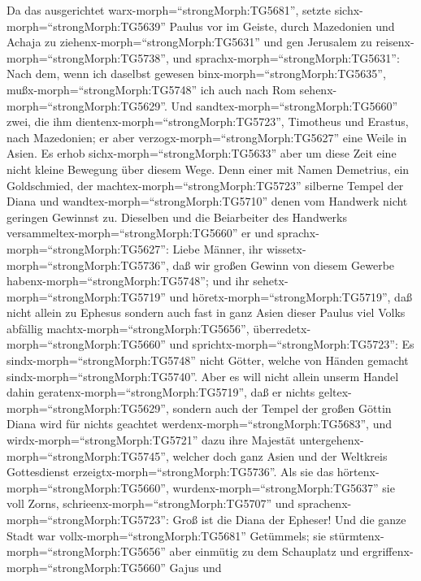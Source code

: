 Da das ausgerichtet warx-morph=``strongMorph:TG5681'', setzte
sichx-morph=``strongMorph:TG5639'' Paulus vor im Geiste, durch
Mazedonien und Achaja zu ziehenx-morph=``strongMorph:TG5631'' und gen
Jerusalem zu reisenx-morph=``strongMorph:TG5738'', und
sprachx-morph=``strongMorph:TG5631'': Nach dem, wenn ich daselbst
gewesen binx-morph=``strongMorph:TG5635'',
mußx-morph=``strongMorph:TG5748'' ich auch nach Rom
sehenx-morph=``strongMorph:TG5629''.  Und
sandtex-morph=``strongMorph:TG5660'' zwei, die ihm
dientenx-morph=``strongMorph:TG5723'', Timotheus und Erastus, nach
Mazedonien; er aber verzogx-morph=``strongMorph:TG5627'' eine Weile in
Asien.  Es erhob sichx-morph=``strongMorph:TG5633'' aber um
diese Zeit eine nicht kleine Bewegung über diesem Wege. 
Denn einer mit Namen Demetrius, ein Goldschmied, der
machtex-morph=``strongMorph:TG5723'' silberne Tempel der Diana und
wandtex-morph=``strongMorph:TG5710'' denen vom Handwerk nicht geringen
Gewinnst zu.  Dieselben und die Beiarbeiter des Handwerks
versammeltex-morph=``strongMorph:TG5660'' er und
sprachx-morph=``strongMorph:TG5627'': Liebe Männer, ihr
wissetx-morph=``strongMorph:TG5736'', daß wir großen Gewinn von diesem
Gewerbe habenx-morph=``strongMorph:TG5748'';  und ihr
sehetx-morph=``strongMorph:TG5719'' und
höretx-morph=``strongMorph:TG5719'', daß nicht allein zu Ephesus sondern
auch fast in ganz Asien dieser Paulus viel Volks abfällig
machtx-morph=``strongMorph:TG5656'',
überredetx-morph=``strongMorph:TG5660'' und
sprichtx-morph=``strongMorph:TG5723'': Es
sindx-morph=``strongMorph:TG5748'' nicht Götter, welche von Händen
gemacht sindx-morph=``strongMorph:TG5740''.  Aber es will
nicht allein unserm Handel dahin geratenx-morph=``strongMorph:TG5719'',
daß er nichts geltex-morph=``strongMorph:TG5629'', sondern auch der
Tempel der großen Göttin Diana wird für nichts geachtet
werdenx-morph=``strongMorph:TG5683'', und
wirdx-morph=``strongMorph:TG5721'' dazu ihre Majestät
untergehenx-morph=``strongMorph:TG5745'', welcher doch ganz Asien und
der Weltkreis Gottesdienst erzeigtx-morph=``strongMorph:TG5736''.
 Als sie das hörtenx-morph=``strongMorph:TG5660'',
wurdenx-morph=``strongMorph:TG5637'' sie voll Zorns,
schrieenx-morph=``strongMorph:TG5707'' und
sprachenx-morph=``strongMorph:TG5723'': Groß ist die Diana der Epheser!
 Und die ganze Stadt war vollx-morph=``strongMorph:TG5681''
Getümmels; sie stürmtenx-morph=``strongMorph:TG5656'' aber einmütig zu
dem Schauplatz und ergriffenx-morph=``strongMorph:TG5660'' Gajus und
